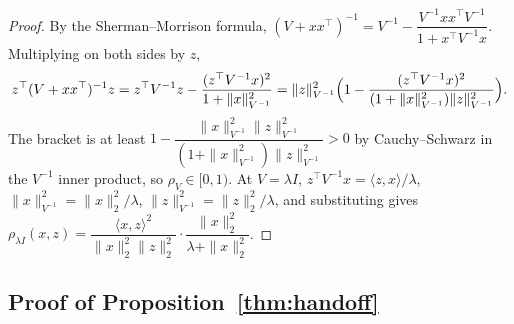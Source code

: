 \documentclass{article}
\theoremstyle{definition}
\theoremstyle{remark}
\theoremstyle{remark}
\begin{document}
\begin{proof}
By the Sherman--Morrison formula,
$(V+xx^\top)^{-1}=V^{-1}-\dfrac{V^{-1}xx^\top V^{-1}}{1+x^\top V^{-1}x}$. Multiplying
on both sides by $z$,
\[
z^\top(V+xx^\top)^{-1}z
= z^\top V^{-1}z-\frac{(z^\top V^{-1}x)^2}{1+\|x\|^2_{V^{-1}}}
=\|z\|^2_{V^{-1}}\Bigl(1-\frac{(z^\top V^{-1}x)^2}{(1+\|x\|^2_{V^{-1}})\|z\|^2_{V^{-1}}}\Bigr).
\]
The bracket is at least $1-\dfrac{\|x\|^2_{V^{-1}}\|z\|^2_{V^{-1}}}{(1+\|x\|^2_{V^{-1}})\|z\|^2_{V^{-1}}}>0$
by Cauchy--Schwarz in the $V^{-1}$ inner product, so $\rho_V\in[0,1)$. At
$V=\lambda I$, $z^\top V^{-1}x=\langle z,x\rangle/\lambda$,
$\|x\|^2_{V^{-1}}=\|x\|_2^2/\lambda$, $\|z\|^2_{V^{-1}}=\|z\|_2^2/\lambda$, and
substituting gives
$\rho_{\lambda I}(x,z)=\dfrac{\langle x,z\rangle^2}{\|x\|_2^2\|z\|_2^2}\cdot\dfrac{\|x\|_2^2}{\lambda+\|x\|_2^2}$.
\end{proof}

\subsection{Proof of Proposition~\ref{thm:handoff}}
\label{app:proof-handoff}
\end{document}
